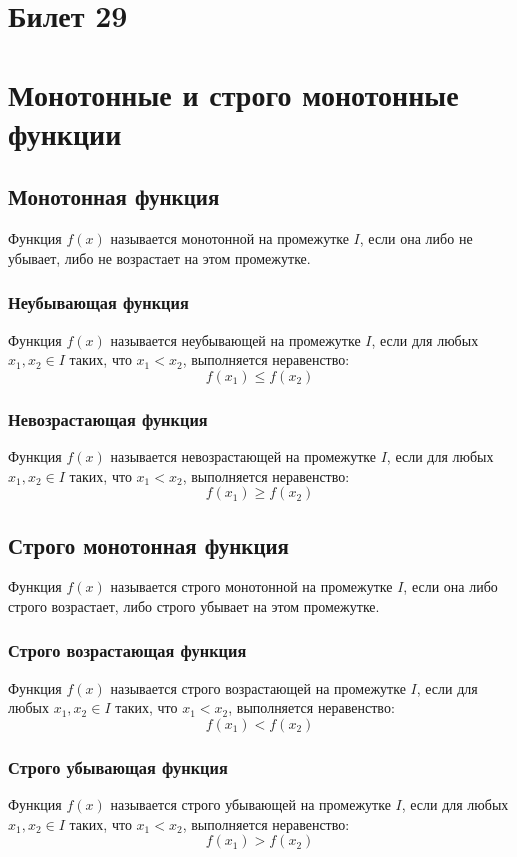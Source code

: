\documentclass{article}
\begin{document}
\section{Билет 29}

\section*{Монотонные и строго монотонные функции}

\subsection*{Монотонная функция}
Функция \( f(x) \) называется монотонной на промежутке \( I \), если она либо не убывает, либо не возрастает на этом промежутке.

\subsubsection*{Неубывающая функция}
Функция \( f(x) \) называется неубывающей на промежутке \( I \), если для любых \( x_1, x_2 \in I \) таких, что \( x_1 < x_2 \), выполняется неравенство:
\[
f(x_1) \leq f(x_2)
\]

\subsubsection*{Невозрастающая функция}
Функция \( f(x) \) называется невозрастающей на промежутке \( I \), если для любых \( x_1, x_2 \in I \) таких, что \( x_1 < x_2 \), выполняется неравенство:
\[
f(x_1) \geq f(x_2)
\]

\subsection*{Строго монотонная функция}
Функция \( f(x) \) называется строго монотонной на промежутке \( I \), если она либо строго возрастает, либо строго убывает на этом промежутке.

\subsubsection*{Строго возрастающая функция}
Функция \( f(x) \) называется строго возрастающей на промежутке \( I \), если для любых \( x_1, x_2 \in I \) таких, что \( x_1 < x_2 \), выполняется неравенство:
\[
f(x_1) < f(x_2)
\]

\subsubsection*{Строго убывающая функция}
Функция \( f(x) \) называется строго убывающей на промежутке \( I \), если для любых \( x_1, x_2 \in I \) таких, что \( x_1 < x_2 \), выполняется неравенство:
\[
f(x_1) > f(x_2)
\]
\end{document}
